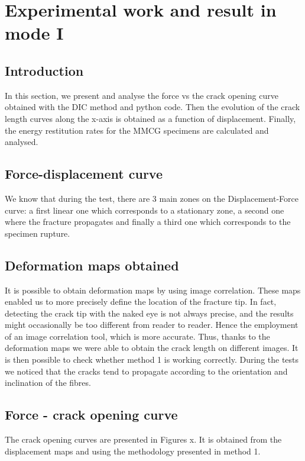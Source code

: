 \chapter{Experimental work and result in mode I}
\label{Chapter3}

\section{Introduction}

In this section, we present and analyse the force vs the crack opening curve obtained with the DIC method and python code.  Then the evolution of the crack length curves along the x-axis is obtained as a function of displacement. Finally, the energy restitution rates for the MMCG specimens are calculated and analysed.

\section{Force-displacement curve}

We know that during the test, there are 3 main zones on the Displacement-Force curve: a first linear one which corresponds to a stationary zone, a second one where the fracture propagates and finally a third one which corresponds to the specimen rupture.

\section{Deformation maps obtained}

It is possible to obtain deformation maps by using image correlation. These maps enabled us to more precisely define the location of the fracture tip. In fact, detecting the crack tip with the naked eye is not always precise, and the results might occasionally be too different from reader to reader. Hence the employment of an image correlation tool, which is more accurate.
Thus, thanks to the deformation maps we were able to obtain the crack length on different images. It is then possible to check whether method 1 is working correctly.
During the tests we noticed that the cracks tend to propagate according to the orientation and inclination of the fibres.


\section{Force - crack opening curve}

The crack opening curves are presented in Figures x. It is obtained from the displacement maps and using the methodology presented in method 1.

